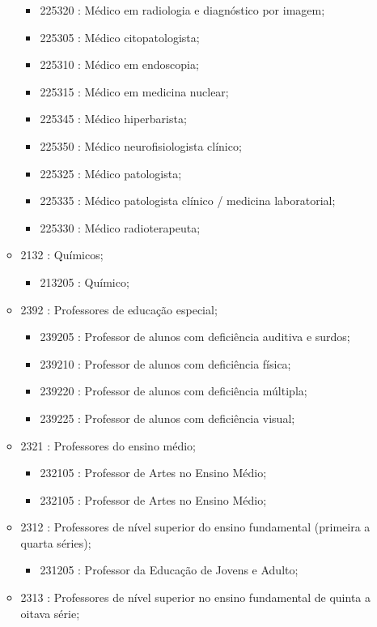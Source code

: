 \begin{itemize}
\begin{itemize}
\begin{itemize}
      \item 225320 : Médico em radiologia e diagnóstico por imagem;
      \item 225305 : Médico citopatologista;
      \item 225310 : Médico em endoscopia;
      \item 225315 : Médico em medicina nuclear;
      \item 225345 : Médico hiperbarista;
      \item 225350 : Médico neurofisiologista clínico;
      \item 225325 : Médico patologista;
      \item 225335 : Médico patologista clínico / medicina laboratorial;
      \item 225330 : Médico radioterapeuta;
    \end{itemize}
    \item 2132 : Químicos;
    \begin{itemize}
      \item 213205 : Químico;
    \end{itemize}
    \item 2392 : Professores de educação especial;
    \begin{itemize}
      \item 239205 : Professor de alunos com deficiência auditiva e surdos;
      \item 239210 : Professor de alunos com deficiência física;
      \item 239220 : Professor de alunos com deficiência múltipla;
      \item 239225 : Professor de alunos com deficiência visual;
    \end{itemize}
    \item 2321 : Professores do ensino médio;
    \begin{itemize}
      \item 232105 : Professor de Artes no Ensino Médio;
      \item 232105 : Professor de Artes no Ensino Médio;
    \end{itemize}
    \item 2312 : Professores de nível superior do ensino fundamental (primeira a quarta séries);
    \begin{itemize}
      \item 231205 : Professor da Educação de Jovens e Adulto;
    \end{itemize}
    \item 2313 : Professores de nível superior no ensino fundamental de quinta a oitava série;

\end{itemize}
\end{itemize}

